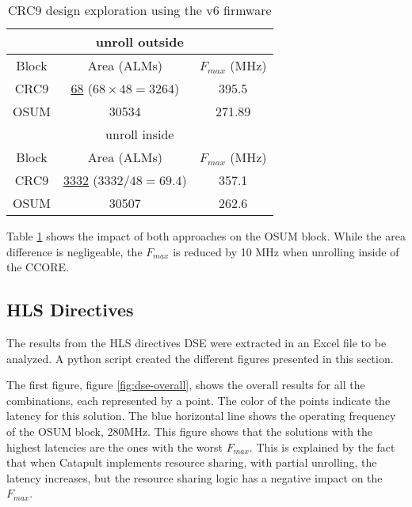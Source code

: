 \begin{itemize}
\begin{table}[ht]
    \centering
    \begin{tabular}{|c|c|c|}
        \hline
        \hline
        \multicolumn{3}{|c|}{unroll outside} \\
        \hline
        Block & Area (ALMs) & \(F_{max}\) (MHz) \\
        \hline
        CRC9 & \underline{68} (\(68\times48=3264\)) & 395.5 \\
        OSUM & 30534 & 271.89 \\
        \hline
        \hline
        \multicolumn{3}{|c|}{unroll inside} \\
        \hline
        Block & Area (ALMs) & \(F_{max}\) (MHz) \\
        \hline
        CRC9 & \underline{3332} (\(3332/48=69.4\))& 357.1\\
        OSUM & 30507 & 262.6\\
        \hline
    \end{tabular}
    \caption{CRC9 design exploration using the v6 firmware}
    \label{tab:crc9-optimization}
\end{table}

Table \ref{tab:crc9-optimization} shows the impact of both approaches on the OSUM block. While the area difference is negligeable, the \(F_{max}\) is reduced by 10 MHz when unrolling inside of the CCORE. 


\subsection{HLS Directives}

The results from the HLS directives DSE were extracted in an Excel file to be analyzed. A python script created the different figures presented in this section.

The first figure, figure \ref{fig:dse-overall}, shows the overall results for all the combinations, each represented by a point. The color of the points indicate the latency for this solution. The blue horizontal line shows the operating frequency of the OSUM block, 280MHz. This figure shows that the solutions with the highest latencies are the ones with the worst \(F_{max}\). This is explained by the fact that when Catapult implements resource sharing, with partial unrolling, the latency increases, but the resource sharing logic has a negative impact on the \(F_{max}\).


\end{itemize}
